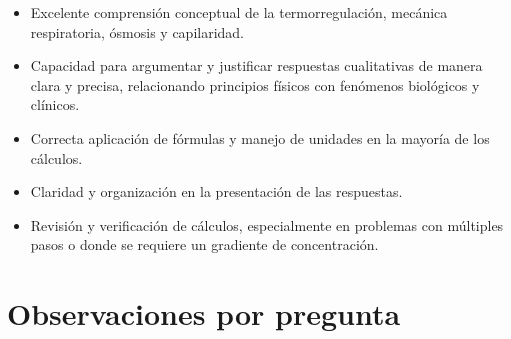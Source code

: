 \documentclass[11pt,a4paper]{article}
\begin{document}
\vspace{4pt}
\begin{minipage}[t]{0.48\linewidth}
  \begin{tcolorbox}[cajaFortaleza, title={Fortalezas}]
\begin{itemize}[leftmargin=1.5em, itemsep=2pt]
  \item Excelente comprensión conceptual de la termorregulación, mecánica respiratoria, ósmosis y capilaridad.
  \item Capacidad para argumentar y justificar respuestas cualitativas de manera clara y precisa, relacionando principios físicos con fenómenos biológicos y clínicos.
  \item Correcta aplicación de fórmulas y manejo de unidades en la mayoría de los cálculos.
  \item Claridad y organización en la presentación de las respuestas.
\end{itemize}
  \end{tcolorbox}
\end{minipage}
\hfill
\begin{minipage}[t]{0.48\linewidth}
  \begin{tcolorbox}[cajaMejora, title={Areas de mejora}]
\begin{itemize}[leftmargin=1.5em, itemsep=2pt]
  \item Revisión y verificación de cálculos, especialmente en problemas con múltiples pasos o donde se requiere un gradiente de concentración.
\end{itemize}
  \end{tcolorbox}
\end{minipage}

\section*{Observaciones por pregunta}
\end{document}
